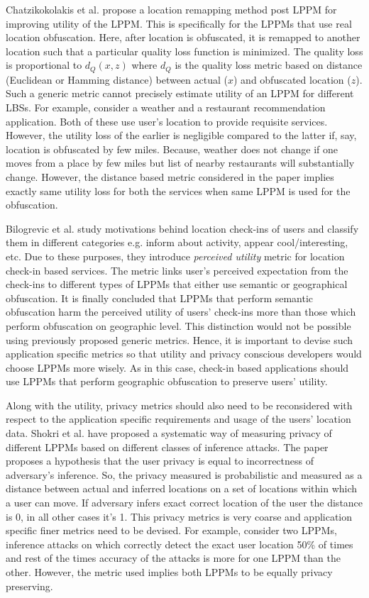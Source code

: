 \documentclass[USenglish,oneside,twocolumn]{article}
\begin{document}
Chatzikokolakis et al.\cite{util-imp} propose a location remapping method post LPPM for improving utility of the LPPM. This is specifically for the LPPMs that use real location obfuscation. Here, after location is obfuscated, it is remapped to another location such that a particular quality loss function is minimized. The quality loss is proportional to $d_{Q}(x,z)$ where $d_{Q}$ is the quality loss metric based on distance (Euclidean or Hamming distance) between actual ($x$) and obfuscated location ($z$). Such a generic metric cannot precisely estimate utility of an LPPM for different LBSs. For example, consider a weather and a restaurant recommendation application. Both of these use user's location to provide requisite services. However, the utility loss of the earlier is negligible compared to the latter if, say, location is obfuscated by few miles. Because, weather does not change if one moves from a place by few miles but list of nearby restaurants will substantially change. However, the distance based metric considered in the paper implies exactly same utility loss for both the services when same LPPM is used for the obfuscation.

Bilogrevic et al.\cite{ndss15} study motivations behind location check-ins of users and classify them in different categories e.g. inform about activity, appear cool/interesting, etc. Due to these purposes, they introduce \textit{perceived utility} metric for location check-in based services. The metric links user's perceived expectation from the check-ins to different types of LPPMs that either use semantic or geographical obfuscation. It is finally concluded that LPPMs that perform semantic obfuscation harm the perceived utility of users' check-ins more than those which perform obfuscation on geographic level. This distinction would not be possible using previously proposed generic metrics. Hence, it is important to devise such application specific metrics so that utility and privacy conscious developers would choose LPPMs more wisely. As in this case, check-in based applications should use LPPMs that perform geographic obfuscation to preserve users' utility.

Along with the utility, privacy metrics should also need to be reconsidered with respect to the application specific requirements and usage of the users' location data. Shokri et al.\cite{qlp} have proposed a systematic way of measuring privacy of different LPPMs based on different classes of inference attacks. The paper proposes a hypothesis that the user privacy is equal to incorrectness of adversary's inference. So, the privacy measured is probabilistic and measured as a distance between actual and inferred locations on a set of locations within which a user can move. If adversary infers exact correct location of the user the distance is 0, in all other cases it's 1. This privacy metrics is very coarse and application specific finer metrics need to be devised. For example, consider two LPPMs, inference attacks on which correctly detect the exact user location 50\% of times and rest of the times accuracy of the attacks is more for one LPPM than the other. However, the metric used implies both LPPMs to be equally privacy preserving.
\end{document}
